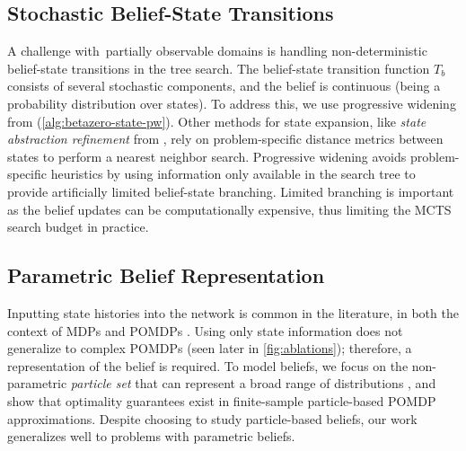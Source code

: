 \begin{figure}[ht]
    \centering
    
    \vspace*{-7mm}
\end{figure}

\subsection{Stochastic Belief-State Transitions}
A challenge with~partially observable domains is handling non-deterministic belief-state transitions in the tree search.
The belief-state transition function $T_b$ consists of several stochastic components, and the belief is continuous (being a probability distribution over states).
To address this, we use progressive widening from \textcite{couetoux2011continuous} (\cref{alg:betazero-state-pw}).
Other methods for state expansion, like \textit{state abstraction refinement} from \textcite{sokota2021monte}, rely on problem-specific distance metrics between states to perform a nearest neighbor search.
Progressive widening avoids problem-specific heuristics by using information only available in the search tree to provide artificially limited belief-state branching.
Limited branching is important as the belief updates can be computationally expensive, thus limiting the MCTS search budget in practice.

\begin{figure}[ht]
    \vspace*{-3mm}
    \centering
    
    \vspace*{-4mm}
\end{figure}

\subsection{Parametric Belief Representation}
Inputting state histories into the network is common in the literature, in both the context of MDPs \cite{silver2018general} and POMDPs \cite{cai2022closing}.
Using only state information does not generalize to complex POMDPs (seen later in \cref{fig:ablations}); therefore, a representation of the belief is required.
To model beliefs, we focus on the non-parametric \textit{particle set} that can represent a broad range of distributions \cite{thrun2005probabilistic}, and \textcite{lim2023optimality} show that optimality guarantees exist in finite-sample particle-based POMDP approximations.
Despite choosing to study particle-based beliefs, our work generalizes well to problems with parametric beliefs.


